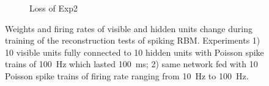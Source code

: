\begin{figure}
\begin{subfigure}[t]{0.4\textwidth}
		\caption{Loss of Exp2}
	\end{subfigure}
	\caption{Weights and firing rates of visible and hidden units change during training of the reconstruction tests of spiking RBM. 
		Experiments 1) 10 visible units fully connected to 10 hidden units with Poisson spike trains of 100~Hz which lasted 100~ms; 2) same network fed with 10 Poisson spike trains of firing rate ranging from 10~Hz to 100~Hz.}
\end{figure}

